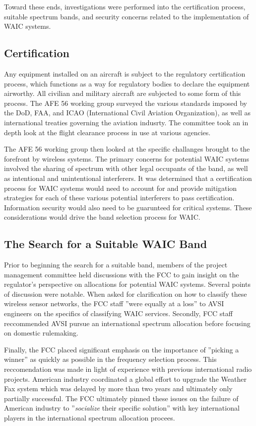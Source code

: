 Toward these ends, investigations were performed into the certification process, suitable spectrum bands, and security concerns related to the implementation of WAIC systems. 

\subsection{Certification}
Any equipment installed on an aircraft is subject to the regulatory certification process, which functions as a way for regulatory bodies to declare the equipment airworthy. All civilian and military aircraft are subjected to some form of this process. The AFE 56 working group surveyed the various standards imposed by the DoD, FAA, and ICAO (International Civil Aviation Organization), as well as international treaties governing the aviation indusrty. The committee took an in depth look at the flight clearance process in use at various agencies. 

The AFE 56 working group then looked at the specific challanges brought to the forefront by wireless systems. The primary concerns for potential WAIC  systems involved the sharing of spectrum with other legal occupants of the band,  as well as intentional and unintentional interferers. It was determined that a certification process for WAIC systems would need to account for and provide mitigation strategies for each of these various potential interferers to pass certification. Information security would also need to be guarunteed for critical systems. These considerations would drive the band selection process for WAIC. 

\subsection{The Search for a Suitable WAIC Band}
Prior to beginning the search for a suitable band, members of the project management committee held discussions with the FCC to gain insight on the regulator's perspective on allocations for potential WAIC systems. Several points of discussion were notable. When asked for clarification on how to classify these wireless sensor networks, the FCC staff ''were equally at a loss'' to AVSI engineers on the specifics of classifying WAIC services. Secondly, FCC staff reccommended AVSI pursue an international spectrum allocation before focusing on domestic rulemaking. 
	
	Finally, the FCC placed significant emphasis on the importance of  ''picking a winner'' as quickly as possible in the frequency selection process. This reccomendation was made in light of experience with previous international radio projects. American industry coordinated a global effort to upgrade the Weather Fax system which was delayed by more than two years and ultimately only partially successful. The FCC ultimately pinned these issues on the failure of American industry to ''\textit{socialize} their specific solution'' with key international players in the international spectrum allocation procees.  
 
